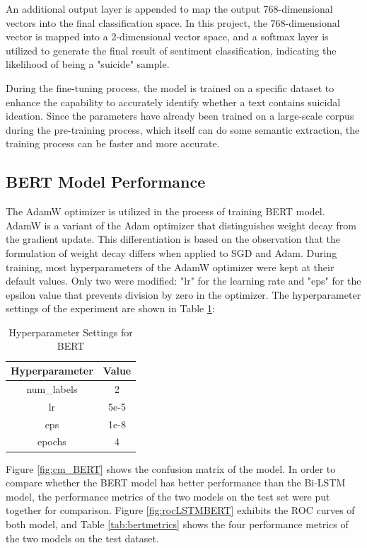 \documentclass[ %
                    author={Bocheng Wang},
                supervisor={Dr. Qiang Liu},
                    degree={MSc},
                     title={A Research on Identification of Suicide Ideation in Texts with Multiple Models},
                      type={},
                      year={2024}]{dissertation}
\begin{document}
An additional output layer is appended to map the output 768-dimensional vectors into the final classification space. In this project, the 768-dimensional vector is mapped into a 2-dimensional vector space, and a softmax layer is utilized to generate the final result of sentiment classification, indicating the likelihood of being a "suicide" sample.

During the fine-tuning process, the model is trained on a specific dataset to enhance the capability to accurately identify whether a text contains suicidal ideation. Since the parameters have already been trained on a large-scale corpus during the pre-training process, which itself can do some semantic extraction, the training process can be faster and more accurate.

\subsection{BERT Model Performance}
\noindent
The AdamW optimizer\cite{loshchilov2019decoupled} is utilized in the process of training BERT model. AdamW is a variant of the Adam optimizer that distinguishes weight decay from the gradient update. This differentiation is based on the observation that the formulation of weight decay differs when applied to SGD and Adam. During training, most hyperparameters of the AdamW optimizer were kept at their default values. Only two were modified: "lr" for the learning rate and "eps" for the epsilon value that prevents division by zero in the optimizer. The hyperparameter settings of the experiment are shown in Table \ref{tab:berthyperparameter}:

\begin{table}[h]
      \centering
      \begin{tabular}{cc}
            \hline
            Hyperparameter & Value \\
            \hline
            num\_labels & 2      \\
            lr          & 5e-5   \\
            eps         & 1e-8   \\
            epochs      & 4      \\
            \hline
      \end{tabular}
      \caption{Hyperparameter Settings for BERT}
      \label{tab:berthyperparameter}
\end{table}

Figure \ref{fig:cm_BERT} shows the confusion matrix of the model. In order to compare whether the BERT model has better performance than the Bi-LSTM model, the performance metrics of the two models on the test set were put together for comparison. Figure \ref{fig:rocLSTMBERT} exhibits the ROC curves of both model, and Table \ref{tab:bertmetrics} shows the four performance metrics of the two models on the test dataset. 
\end{document}
